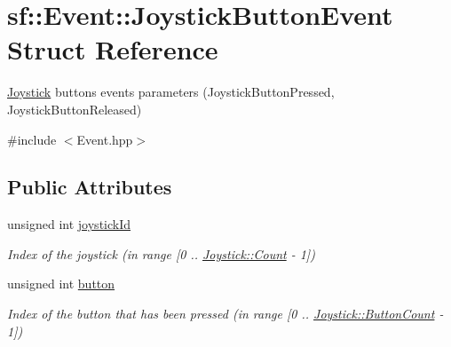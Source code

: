 \hypertarget{structsf_1_1Event_1_1JoystickButtonEvent}{\section{sf\-:\-:Event\-:\-:Joystick\-Button\-Event Struct Reference}
\label{structsf_1_1Event_1_1JoystickButtonEvent}
}


\hyperlink{classsf_1_1Joystick}{Joystick} buttons events parameters (Joystick\-Button\-Pressed, Joystick\-Button\-Released)  




{\ttfamily \#include $<$Event.\-hpp$>$}

\subsection*{Public Attributes}
\begin{DoxyCompactItemize}
\item 
\hypertarget{structsf_1_1Event_1_1JoystickButtonEvent_a2f80ecdb964a5ae0fc30726a404c41ec}{unsigned int \hyperlink{structsf_1_1Event_1_1JoystickButtonEvent_a2f80ecdb964a5ae0fc30726a404c41ec}{joystick\-Id}}\label{structsf_1_1Event_1_1JoystickButtonEvent_a2f80ecdb964a5ae0fc30726a404c41ec}

\begin{DoxyCompactList}\small\item\em Index of the joystick (in range \mbox{[}0 .. \hyperlink{classsf_1_1Joystick_a951a7c775921304a5f3443c6e2bb4d65a6e0a2a95bc1da277610c04d80f52715e}{Joystick\-::\-Count} -\/ 1\mbox{]}) \end{DoxyCompactList}\item 
\hypertarget{structsf_1_1Event_1_1JoystickButtonEvent_a6412e698a2f7904c5aa875a0d1b34da4}{unsigned int \hyperlink{structsf_1_1Event_1_1JoystickButtonEvent_a6412e698a2f7904c5aa875a0d1b34da4}{button}}\label{structsf_1_1Event_1_1JoystickButtonEvent_a6412e698a2f7904c5aa875a0d1b34da4}

\begin{DoxyCompactList}\small\item\em Index of the button that has been pressed (in range \mbox{[}0 .. \hyperlink{classsf_1_1Joystick_a951a7c775921304a5f3443c6e2bb4d65a2f1b8a0a59f2c12a4775c0e1e69e1816}{Joystick\-::\-Button\-Count} -\/ 1\mbox{]}) \end{DoxyCompactList}\end{DoxyCompactItemize}


